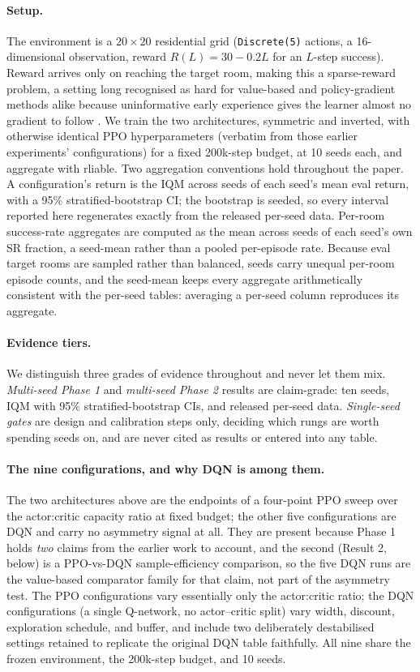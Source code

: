 \documentclass[10pt]{article}
\begin{document}
\paragraph{Setup.} The environment is a $20\times20$ residential grid (\texttt{Discrete(5)}
actions, a 16-dimensional observation, reward $R(L)=30-0.2L$ for an $L$-step success).
Reward arrives only on reaching the target room, making this a sparse-reward problem, a
setting long recognised as hard for value-based and policy-gradient methods alike because
uninformative early experience gives the learner almost no gradient to follow
\citep{andrychowicz2017her}. We train the two architectures, symmetric and inverted, with
otherwise identical PPO \citep{schulman2017ppo} hyperparameters (verbatim from those earlier
experiments' configurations) for a fixed 200k-step budget, at 10 seeds each, and
aggregate with rliable. Two aggregation conventions hold throughout the paper. A
configuration's return is the IQM across seeds of each seed's mean eval return, with a 95\%
stratified-bootstrap CI; the bootstrap is seeded, so every interval reported here regenerates
exactly from the released per-seed data. Per-room success-rate aggregates are
computed as the mean across seeds of each seed's own SR fraction, a seed-mean rather than a
pooled per-episode rate. Because eval target rooms are sampled rather than balanced, seeds
carry unequal per-room episode counts, and the seed-mean keeps every aggregate
arithmetically consistent with the per-seed tables: averaging a per-seed column reproduces
its aggregate.

\paragraph{Evidence tiers.} We distinguish three grades of evidence throughout and never let
them mix. \emph{Multi-seed Phase 1} and \emph{multi-seed Phase 2} results are claim-grade:
ten seeds, IQM with 95\% stratified-bootstrap CIs, and released per-seed data.
\emph{Single-seed gates} are design and calibration steps only, deciding which rungs are
worth spending seeds on, and are never cited as results or entered into any table.

\paragraph{The nine configurations, and why DQN is among them.} The two architectures above
are the endpoints of a four-point PPO sweep over the actor:critic capacity ratio at fixed
budget; the other five configurations are DQN and carry no asymmetry signal at all. They are
present because Phase 1 holds \emph{two} claims from the earlier work to account, and the
second (Result 2, below) is a PPO-vs-DQN sample-efficiency comparison, so the five DQN runs
are the value-based comparator family for that claim, not part of the asymmetry test. The
PPO configurations vary essentially only the actor:critic ratio; the DQN configurations (a
single Q-network, no actor--critic split) vary width, discount, exploration schedule, and
buffer, and include two deliberately destabilised settings retained to replicate the original
DQN table faithfully. All nine share the frozen environment, the 200k-step budget, and 10
seeds.
\end{document}
